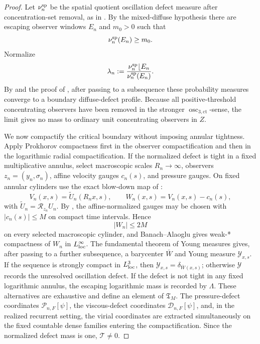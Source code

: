 \documentclass[11pt]{amsart}
\numberwithin{equation}{section}
\theoremstyle{plain}
\theoremstyle{definition}
\theoremstyle{remark}
\newcommand{\calR}{\mathcal R}
\newcommand{\Tcrit}{\mathfrak T_M}
\newcommand{\actthree}{\operatorname{osc}_{3,\mathrm{ct}}}
\begin{document}
\begin{proof}
Let \(\nu_n^{\rm sp}\) be the spatial quotient oscillation defect measure
after concentration-set removal, as in
.  By the mixed-diffuse
hypothesis there are escaping
observer windows \(E_n\) and \(m_0>0\) such that
\[
   \nu_n^{\rm sp}(E_n)\ge m_0 .
\]
Normalize
\[
   \lambda_n:=
   \frac{\nu_n^{\rm sp}\lfloor E_n}{\nu_n^{\rm sp}(E_n)} .
\]
By  and the proof of
, after passing to a subsequence these
probability measures converge to a boundary diffuse-defect profile.  Because all
positive-threshold concentrating observers have been removed in the stronger
\(\actthree\)-sense, the limit gives no mass to ordinary unit concentrating observers
in \(Z\).

We now compactify the critical boundary without imposing annular tightness.
Apply Prokhorov compactness first in the observer compactification and then in
the logarithmic radial compactification.  If the normalized defect is tight in a
fixed multiplicative annulus, select macroscopic scales \(R_n\to\infty\),
observers \(z_n=(y_n,\sigma_n)\), affine velocity gauges \(c_n(s)\), and
pressure gauges.  On fixed annular cylinders use the exact blow-down map of
:
\[
   V_n(x,s)=\widetilde U_n(R_nx,s),\qquad
   W_n(x,s)=V_n(x,s)-c_n(s),
\]
with \(\widetilde U_n=\calR_{z_n}U_n\).
By , the affine-normalized gauges
may be chosen with \(|c_n(s)|\le M\) on compact time intervals.  Hence
\[
   |W_n|\le 2M
\]
on every selected macroscopic cylinder, and Banach--Alaoglu gives weak-* compactness of
\(W_n\) in \(L^\infty_{\rm loc}\).  The fundamental theorem of Young
measures gives, after passing to a further subsequence, a barycenter
\(\bar W\) and Young measure \(\mathcal Y_{x,s}\).  If the sequence is strongly
compact in \(L^3_{\rm loc}\), then \(\mathcal Y_{x,s}=\delta_{\bar W(x,s)}\);
otherwise \(\mathcal Y\) records the unresolved oscillation defect.  If the
defect is not tight in any fixed logarithmic annulus, the escaping logarithmic
mass is recorded by \(\Lambda\).  These alternatives are exhaustive and define
an element of \(\Tcrit\).  The pressure-defect coordinates
\(\mathscr P_{n,F}[\psi]\), the viscous-defect coordinates
\(\mathscr D_{n,F}[\psi]\), and, in the realized recurrent setting, the
virial coordinates are extracted simultaneously on the fixed countable dense
families entering the compactification.  Since the normalized defect mass is one,
\(\mathcal T\ne0\).


\end{proof}
\end{document}
